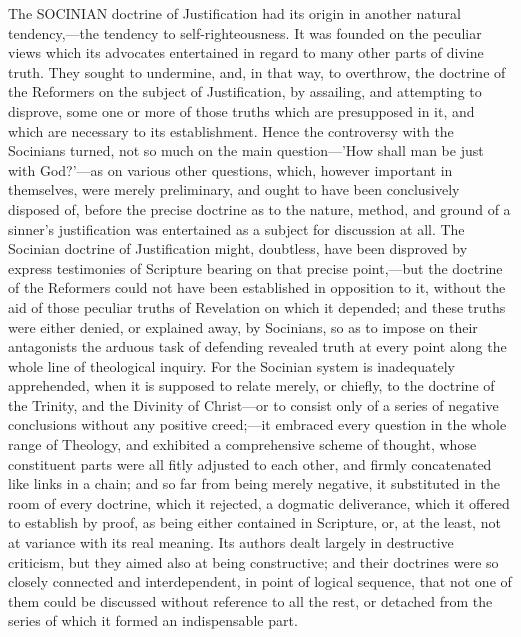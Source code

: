 \documentclass[
]{book}
\begin{document}
The SOCINIAN doctrine of Justification had its origin in another natural tendency,---the tendency to self-righteousness. It was founded on the peculiar views which its advocates entertained in regard to many other parts of divine truth. They sought to undermine, and, in that way, to overthrow, the doctrine of the Reformers on the subject of Justification, by assailing, and attempting to disprove, some one or more of those truths which are presupposed in it, and which are necessary to its establishment. Hence the controversy with the Socinians turned, not so much on the main question---'How shall man be just with God?'---as on various other questions, which, however important in themselves, were merely preliminary, and ought to have been conclusively disposed of, before the precise doctrine as to the nature, method, and ground of a sinner's justification was entertained as a subject for discussion at all. The Socinian doctrine of Justification might, doubtless, have been disproved by express testimonies of Scripture bearing on that precise point,---but the doctrine of the Reformers could not have been established in opposition to it, without the aid of those peculiar truths of Revelation on which it depended; and these truths were either denied, or explained away, by Socinians, so as to impose on their antagonists the arduous task of defending revealed truth at every point along the whole line of theological inquiry. For the Socinian system is inadequately apprehended, when it is supposed to relate merely, or chiefly, to the doctrine of the Trinity, and the Divinity of Christ---or to consist only of a series of negative conclusions without any positive creed;---it embraced every question in the whole range of Theology, and exhibited a comprehensive scheme of thought, whose constituent parts were all fitly adjusted to each other, and firmly concatenated like links in a chain; and so far from being merely negative, it substituted in the room of every doctrine, which it rejected, a dogmatic deliverance, which it offered to establish by proof, as being either contained in Scripture, or, at the least, not at variance with its real meaning. Its authors dealt largely in destructive criticism, but they aimed also at being constructive; and their doctrines were so closely connected and interdependent, in point of logical sequence, that not one of them could be discussed without reference to all the rest, or detached from the series of which it formed an indispensable part.
\end{document}

